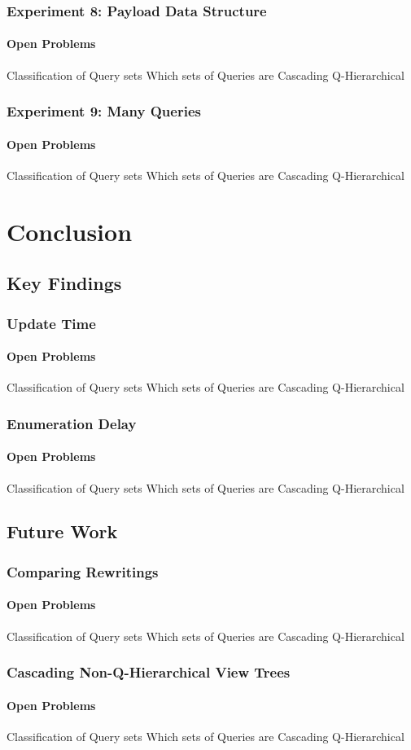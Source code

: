 \documentclass[
	11pt, %
]{beamer}
\begin{document}
\begin{frame}
	\frametitle{Experiment 8: Payload Data Structure}
	\framesubtitle{Open Problems}
	\begin{block}{Classification of Query sets}
		Which sets of Queries are Cascading Q-Hierarchical
	\end{block}
\end{frame}


\begin{frame}
	\frametitle{Experiment 9: Many Queries}
	\framesubtitle{Open Problems}
	\begin{block}{Classification of Query sets}
		Which sets of Queries are Cascading Q-Hierarchical
	\end{block}
\end{frame}

\section{Conclusion}
\subsection{Key Findings}
\begin{frame}
	\frametitle{Update Time}
	\framesubtitle{Open Problems}
	\begin{block}{Classification of Query sets}
		Which sets of Queries are Cascading Q-Hierarchical
	\end{block}
\end{frame}

\begin{frame}
	\frametitle{Enumeration Delay}
	\framesubtitle{Open Problems}
	\begin{block}{Classification of Query sets}
		Which sets of Queries are Cascading Q-Hierarchical
	\end{block}
\end{frame}

\subsection{Future Work}
\begin{frame}
	\frametitle{Comparing Rewritings}
	\framesubtitle{Open Problems}
	\begin{block}{Classification of Query sets}
		Which sets of Queries are Cascading Q-Hierarchical
	\end{block}
\end{frame}

\begin{frame}
	\frametitle{Cascading Non-Q-Hierarchical View Trees}
	\framesubtitle{Open Problems}
	\begin{block}{Classification of Query sets}
		Which sets of Queries are Cascading Q-Hierarchical
	\end{block}
\end{frame}
\end{document}
